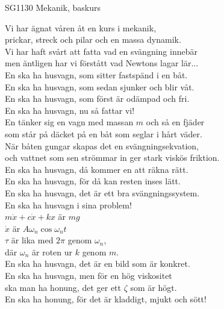 \documentclass[a6paper, 10pt, twoside]{article}
\begin{document}
\noindent
\begin{center}
\footnotesize SG1130 Mekanik, baskurs\\
\end{center}
\begin{lyrics}
Vi har ägnat våren åt en kurs i mekanik, \\
prickar, streck och pilar och en massa dynamik. \\
Vi har haft svårt att fatta vad en svängning innebär\\ 
men äntligen har vi förstått vad Newtons lagar lär...
\vspace{5pt} \\
En ska ha husvagn, som sitter fastspänd i en båt. \\
En ska ha husvagn, som sedan sjunker och blir våt. \\
En ska ha husvagn, som först är odämpad och fri. \\
En ska ha husvagn, nu så fattar vi! 
\vspace{5pt} \\
En tänker sig en vagn med massan $m$ och så en fjäder \\
som står på däcket på en båt som seglar i hårt väder. \\
När båten gungar skapas det en svängningsekvation, \\
och vattnet som sen strömmar in ger stark viskös friktion. 
\vspace{5pt} \\
En ska ha husvagn, då kommer en att räkna rätt. \\
En ska ha husvagn, för då kan resten inses lätt. \\
En ska ha husvagn, det är ett bra svängningssystem. \\
En ska ha husvagn i sina problem! 
\vspace{5pt} \\
$m \ddot{x} + c \dot{x} + k x$ är $m g$ \\
$\dot{x}$ är $A \omega_n \cos \omega_n t$ \\
$\tau$ är lika med $2\pi$ genom $\omega_n$, \\
där $\omega_n$ är roten ur $k$ genom $m$.
\vspace{5pt} \\
En ska ha husvagn, det är en bild som är konkret. \\
En ska ha husvagn, men för en hög viskositet \\
ska man ha honung, det ger ett $\zeta$ som är högt. \\
En ska ha honung, för det är kladdigt, mjukt och sött! 
\end{lyrics}
\end{document}
